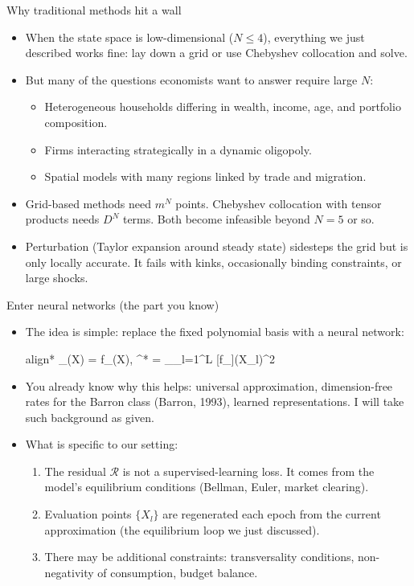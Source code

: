 \documentclass[aspectratio=169,10pt]{beamer}
\newcommand{\Resid}{\mathcal{R}}
\begin{document}
\begin{frame}{Why traditional methods hit a wall}
	\begin{itemize}
		\item When the state space is low-dimensional ($N \le 4$), everything we just described works fine: lay down a grid or use Chebyshev collocation and solve.
		\item But many of the questions economists want to answer require large $N$:
		\begin{itemize}
			\item Heterogeneous households differing in wealth, income, age, and portfolio composition.
			\item Firms interacting strategically in a dynamic oligopoly.
			\item Spatial models with many regions linked by trade and migration.
		\end{itemize}
		\item Grid-based methods need $m^N$ points. Chebyshev collocation with tensor products needs $D^N$ terms. Both become infeasible beyond $N = 5$ or so.
		\item Perturbation (Taylor expansion around steady state) sidesteps the grid but is only locally accurate. It fails with kinks, occasionally binding constraints, or large shocks.
	\end{itemize}
\end{frame}

\begin{frame}{Enter neural networks (the part you know)}
	\begin{itemize}
		\item The idea is simple: replace the fixed polynomial basis with a neural network:
		\begin{empheq}[box=\tcbhighmath]{align*}
			_\theta(X) = f_\theta(X), \qquad \theta^* = \arg\min_\theta {}\sum_{l=1}^{L} \Resid[f_\theta](X_l)^2
		\end{empheq}
		\item You already know why this helps: universal approximation, dimension-free rates for the Barron class (\textcolor{emphcolorval}{Barron, 1993}), learned representations. I will take such background as given.
		\item What is specific to our setting:
		\begin{enumerate}
			\item The residual $\Resid$ is not a supervised-learning loss. It comes from the model's equilibrium conditions (Bellman, Euler, market clearing).
			\item Evaluation points $\{X_l\}$ are regenerated each epoch from the current approximation (the equilibrium loop we just discussed).
			\item There may be additional constraints: transversality conditions, non-negativity of consumption, budget balance.
		\end{enumerate}
	\end{itemize}
\end{frame}
\end{document}
